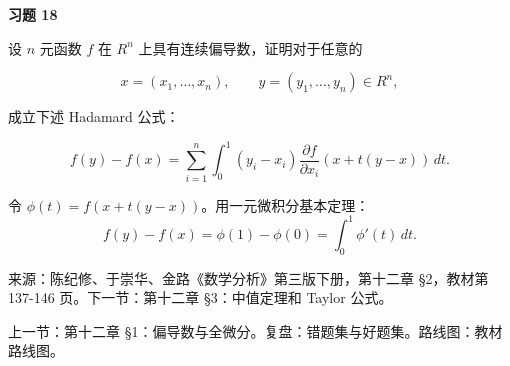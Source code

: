 \begin{exercisebox}
\textbf{习题 18}

设 \(n\) 元函数 \(f\) 在 \(R^n\) 上具有连续偏导数，证明对于任意的

\[
        x=(x_1,\ldots,x_n),\qquad y=(y_1,\ldots,y_n)\in R^n,
      \]

成立下述 Hadamard 公式：

\[
        f(y)-f(x)
        =
        \sum_{i=1}^{n}
        \int_0^1
        (y_i-x_i)
        \frac{\partial f}{\partial x_i}(x+t(y-x))\,dt.
      \]

\begin{hintbox}
令 \(\phi(t)=f(x+t(y-x))\)。用一元微积分基本定理： \[
          f(y)-f(x)=\phi(1)-\phi(0)=\int_0^1\phi'(t)\,dt.
        \]
\end{hintbox}
\end{exercisebox}

来源：陈纪修、于崇华、金路《数学分析》第三版下册，第十二章 §2，教材第 137-146 页。下一节：第十二章 §3：中值定理和 Taylor 公式。

上一节：第十二章 §1：偏导数与全微分。复盘：错题集与好题集。路线图：教材路线图。
